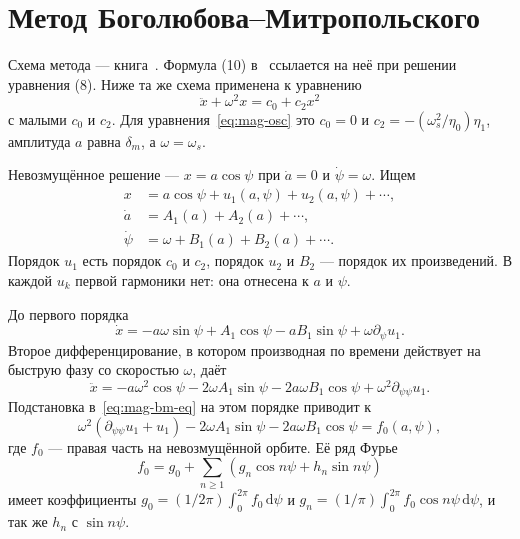 \section{Метод Боголюбова--Митропольского}
\label{app:ch1bm}

Схема метода --- книга~\cite{Bogoliubov1961}. Формула (10) в~\cite{Senichev2013} ссылается на неё при решении уравнения (8). Ниже та же схема применена к уравнению
\begin{equation}
\label{eq:mag-bm-eq}
\ddot x+\omega^2 x=c_0+c_2 x^2
\end{equation}
с малыми $c_0$ и $c_2$. Для уравнения~\eqref{eq:mag-osc} это $c_0=0$ и $c_2=-(\omega_s^2/\eta_0)\eta_1$, амплитуда $a$ равна $\delta_m$, а $\omega=\omega_s$.

Невозмущённое решение --- $x=a\cos\psi$ при $\dot a=0$ и $\dot\psi=\omega$. Ищем
\begin{align}
x&=a\cos\psi+u_1(a,\psi)+u_2(a,\psi)+\cdots,
\label{eq:mag-bm-ansatz}\\
\dot a&=A_1(a)+A_2(a)+\cdots,
\label{eq:mag-bm-adot}\\
\dot\psi&=\omega+B_1(a)+B_2(a)+\cdots.
\label{eq:mag-bm-psidot}
\end{align}
Порядок $u_1$ есть порядок $c_0$ и $c_2$, порядок $u_2$ и $B_2$ --- порядок их произведений. В каждой $u_k$ первой гармоники нет: она отнесена к $a$ и $\psi$.

До первого порядка
\begin{equation}
\label{eq:mag-bm-xdot}
\dot x=-a\omega\sin\psi
+A_1\cos\psi-a B_1\sin\psi+\omega\partial_\psi u_1.
\end{equation}
Второе дифференцирование, в котором производная по времени действует на быструю фазу со скоростью $\omega$, даёт
\begin{equation}
\label{eq:mag-bm-xddot}
\ddot x=-a\omega^2\cos\psi
-2\omega A_1\sin\psi-2a\omega B_1\cos\psi
+\omega^2\partial_{\psi\psi}u_1.
\end{equation}
Подстановка в~\eqref{eq:mag-bm-eq} на этом порядке приводит к
\begin{equation}
\label{eq:mag-bm-order1}
\omega^2(\partial_{\psi\psi}u_1+u_1)
-2\omega A_1\sin\psi-2a\omega B_1\cos\psi
=f_0(a,\psi),
\end{equation}
где $f_0$ --- правая часть на невозмущённой орбите. Её ряд Фурье
\begin{equation}
\label{eq:mag-bm-fourier}
f_0=g_0+\sum_{n\ge 1}(g_n\cos n\psi+h_n\sin n\psi)
\end{equation}
имеет коэффициенты $g_0=(1/2\pi)\int_0^{2\pi}f_0\,\mathrm{d}\psi$ и $g_n=(1/\pi)\int_0^{2\pi}f_0\cos n\psi\,\mathrm{d}\psi$, и так же $h_n$ с $\sin n\psi$.

